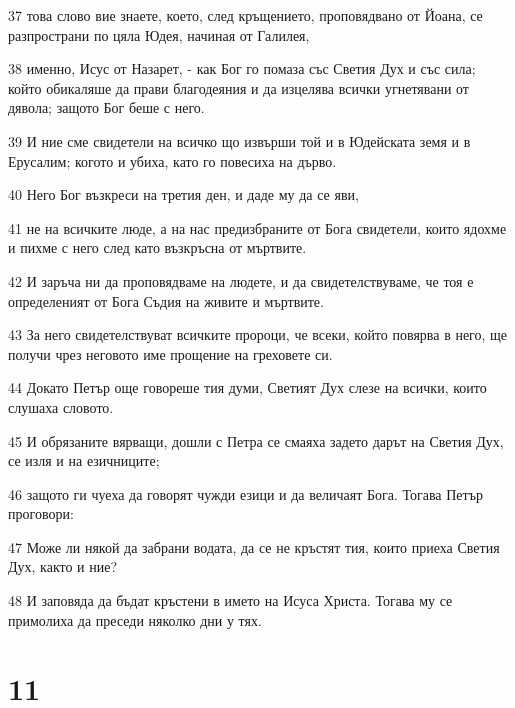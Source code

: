 \par 37 това слово вие знаете, което, след кръщението, проповядвано от Йоана, се разпространи по цяла Юдея, начиная от Галилея,
\par 38 именно, Исус от Назарет, - как Бог го помаза със Светия Дух и със сила; който обикаляше да прави благодеяния и да изцелява всички угнетявани от дявола; защото Бог беше с него.
\par 39 И ние сме свидетели на всичко що извърши той и в Юдейската земя и в Ерусалим; когото и убиха, като го повесиха на дърво.
\par 40 Него Бог възкреси на третия ден, и даде му да се яви,
\par 41 не на всичките люде, а на нас предизбраните от Бога свидетели, които ядохме и пихме с него след като възкръсна от мъртвите.
\par 42 И заръча ни да проповядваме на людете, и да свидетелствуваме, че тоя е определеният от Бога Съдия на живите и мъртвите.
\par 43 За него свидетелствуват всичките пророци, че всеки, който повярва в него, ще получи чрез неговото име прощение на греховете си.
\par 44 Докато Петър още говореше тия думи, Светият Дух слезе на всички, които слушаха словото.
\par 45 И обрязаните вярващи, дошли с Петра се смаяха задето дарът на Светия Дух, се изля и на езичниците;
\par 46 защото ги чуеха да говорят чужди езици и да величаят Бога. Тогава Петър проговори:
\par 47 Може ли някой да забрани водата, да се не кръстят тия, които приеха Светия Дух, както и ние?
\par 48 И заповяда да бъдат кръстени в името на Исуса Христа. Тогава му се примолиха да преседи няколко дни у тях.

\chapter{11}

